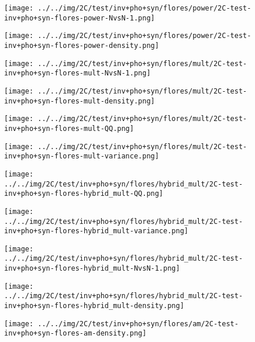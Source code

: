 \begin{figure}[H]
\centering	\texttt{[image: ../../img/2C/test/inv+pho+syn/flores/power/2C-test-inv+pho+syn-flores-power-NvsN-1.png]}
\end{figure}
\begin{figure}[H]
\centering	\texttt{[image: ../../img/2C/test/inv+pho+syn/flores/power/2C-test-inv+pho+syn-flores-power-density.png]}
\end{figure}
\begin{figure}[H]
\centering	\texttt{[image: ../../img/2C/test/inv+pho+syn/flores/mult/2C-test-inv+pho+syn-flores-mult-NvsN-1.png]}
\end{figure}
\begin{figure}[H]
\centering	\texttt{[image: ../../img/2C/test/inv+pho+syn/flores/mult/2C-test-inv+pho+syn-flores-mult-density.png]}
\end{figure}
\begin{figure}[H]
\centering	\texttt{[image: ../../img/2C/test/inv+pho+syn/flores/mult/2C-test-inv+pho+syn-flores-mult-QQ.png]}
\end{figure}
\begin{figure}[H]
\centering	\texttt{[image: ../../img/2C/test/inv+pho+syn/flores/mult/2C-test-inv+pho+syn-flores-mult-variance.png]}
\end{figure}
\begin{figure}[H]
\centering	\texttt{[image: ../../img/2C/test/inv+pho+syn/flores/hybrid\_mult/2C-test-inv+pho+syn-flores-hybrid\_mult-QQ.png]}
\end{figure}
\begin{figure}[H]
\centering	\texttt{[image: ../../img/2C/test/inv+pho+syn/flores/hybrid\_mult/2C-test-inv+pho+syn-flores-hybrid\_mult-variance.png]}
\end{figure}
\begin{figure}[H]
\centering	\texttt{[image: ../../img/2C/test/inv+pho+syn/flores/hybrid\_mult/2C-test-inv+pho+syn-flores-hybrid\_mult-NvsN-1.png]}
\end{figure}
\begin{figure}[H]
\centering	\texttt{[image: ../../img/2C/test/inv+pho+syn/flores/hybrid\_mult/2C-test-inv+pho+syn-flores-hybrid\_mult-density.png]}
\end{figure}
\begin{figure}[H]
\centering	\texttt{[image: ../../img/2C/test/inv+pho+syn/flores/am/2C-test-inv+pho+syn-flores-am-density.png]}
\end{figure}
